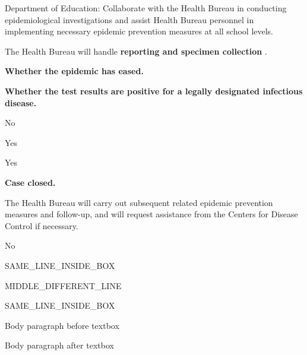 \documentclass[11pt,a4paper]{article}
\begin{document}
\begin{figure}[h]
\end{figure}

Department of Education:
Collaborate with the Health Bureau in conducting epidemiological investigations and assist Health Bureau personnel in implementing necessary epidemic prevention measures at all school levels.

\begin{figure}[h]
\end{figure}

\begin{figure}[h]
\end{figure}

The Health Bureau will handle \textbf{reporting and specimen collection} .

\begin{figure}[h]
\end{figure}

\begin{figure}[h]
\end{figure}

\textbf{Whether the epidemic has eased.}

\begin{figure}[h]
\end{figure}

\textbf{Whether the test results are positive for a legally designated infectious disease.}

No

\begin{figure}[h]
\end{figure}

\begin{figure}[h]
\end{figure}

Yes

\begin{figure}[h]
\end{figure}

Yes

\begin{figure}[h]
\end{figure}

\textbf{Case closed.}

The Health Bureau will carry out subsequent related epidemic prevention measures and follow-up, and will request assistance from the Centers for Disease Control if necessary.

\begin{figure}[h]
\end{figure}

No

\begin{figure}[h]
\end{figure}

\begin{figure}[h]
\end{figure}

SAME\_LINE\_INSIDE\_BOX

MIDDLE\_DIFFERENT\_LINE

SAME\_LINE\_INSIDE\_BOX

\begin{figure}[h]
\end{figure}

Body paragraph before textbox

Body paragraph after textbox
\end{document}
